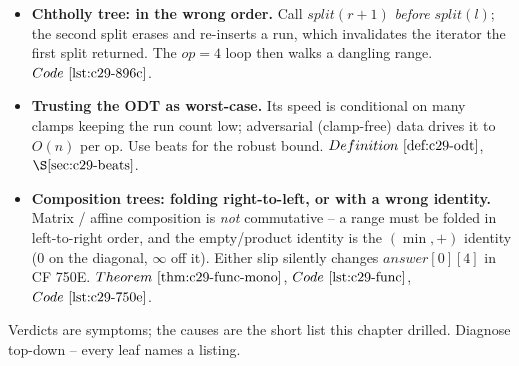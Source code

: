 \begin{itemize}[nosep, leftmargin=1.4em]
  \item \textbf{Chtholly tree:  in the wrong order.} Call \(\mathit{split}(r+1)\)
        \emph{before} \(\mathit{split}(l)\); the second split erases and re-inserts a run, which
        invalidates the iterator the first split returned. The \(\mathit{op}=4\) loop then walks a
        dangling range. \(\coderef{c29-896c}\).
  \item \textbf{Trusting the ODT as worst-case.} Its speed is conditional on many clamps keeping
        the run count low; adversarial (clamp-free) data drives it to \(O(n)\) per op. Use beats for
        the robust bound. \(\defref{c29-odt}\), \(\secref{c29-beats}\).
  \item \textbf{Composition trees: folding right-to-left, or with a wrong identity.} Matrix / affine
        composition is \emph{not} commutative -- a range must be folded in left-to-right order, and
        the empty/product identity is the \((\min,+)\) identity (0 on the diagonal, \(\infty\) off
        it). Either slip silently changes \(\mathit{answer}[0][4]\) in CF 750E.
        \(\thmref{c29-func-mono}\), \(\coderef{c29-func}\), \(\coderef{c29-750e}\).
\end{itemize}


Verdicts are symptoms; the causes are the short list this chapter drilled. Diagnose top-down --
every leaf names a listing.

